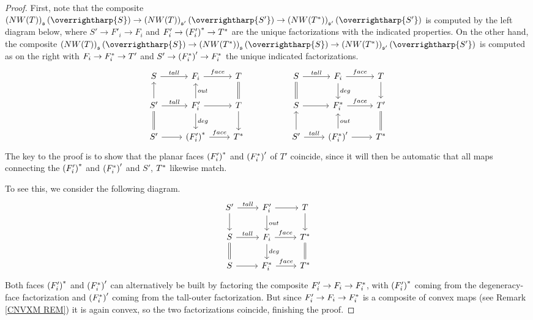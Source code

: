 \documentclass[a4paper,10pt
,draft
]{article}%
\numberwithin{equation}{section}
\numberwithin{figure}{section}
\theoremstyle{definition} %
\newcommand{\vect}[1]{\text{\overrightharp{\ensuremath{#1}}}}
\newcommand{\1}{\ensuremath{\mathbbm 1}}%
\begin{document}
\begin{proof}
First, note that the composite
$\left(NW(T)\right)_{\mathfrak{s}}(\vect{S})
\to 
\left(NW(T)\right)_{\mathfrak{s}'}(\vect{S'})
\to 
\left(NW(T^{\**})\right)_{\mathfrak{s}'}(\vect{S'})$
is computed by the left diagram below,
where
$S' \to F'_i \to F_i$
and 
$F'_i \to \left(F_i'\right)^{\**} \to T^{\**}$
are the unique factorizations with the indicated properties.
On the other hand, the composite
$\left(NW(T)\right)_{\mathfrak{s}}(\vect{S})
\to 
\left(NW(T^{\**})\right)_{\mathfrak{s}}(\vect{S})
\to 
\left(NW(T^{\**})\right)_{\mathfrak{s}'}(\vect{S'})$
is computed as on the right
with 
$F_i \to F^{\**}_i \to T'$ and
$S' \to \left(F_i^{\**}\right)' \to F^{\**}_i$
the unique indicated factorizations.
\begin{equation}
\begin{tikzcd}
	S \ar{r}{tall} 
&
	F_i \ar{r}{face} 
&
	T \ar[equal]{d}
&&%
	S \ar{r}{tall} \ar[equal]{d}
&
	F_i \ar{r}{face} \ar{d}{deg} 
&
	T \ar{d}
\\
	S' \ar{u} \ar{r}{tall} \ar[equal]{d}
&
	F'_i \ar{r} \ar{u}[swap]{out} \ar{d}{deg}
&
	T \ar{d}
&&%
	S \ar{r}
&
	F^{\**}_i \ar{r}{face} 
&
	T' \ar[equal]{d}
\\
	S' \ar{r}
&
	\left(F_i'\right)^{\**} \ar{r}{face}
&
	T^{\**}
&&%
	S' \ar{r}{tall} \ar{u}
&
	\left(F_i^{\**}\right)' \ar{r} \ar{u}[swap]{out}
&
	T^{\**}
\end{tikzcd}
\end{equation}
The key to the proof is to show
that the planar faces 
$\left(F_i'\right)^{\**}$ and
$\left(F_i^{\**}\right)'$
of $T'$
coincide, since it will then be automatic that all maps connecting the
$\left(F_i'\right)^{\**}$ and
$\left(F_i^{\**}\right)'$
and $S'$, $T^{\**}$
likewise match.

To see this, we consider the following diagram.
\begin{equation}
\begin{tikzcd}
	S' \ar{r}{tall} \ar{d}
&
	F'_i \ar{r} \ar{d}{out}
&
	T \ar{d}
\\
	S  \ar{r}{tall} \ar[equal]{d}
&
	F_i \ar{r}{face}  \ar{d}{deg}
&
	T^{\**} \ar[equal]{d}
\\
	S \ar{r}
&
	F_i^{\**} \ar{r}{face}
&
	T^{\**}
\end{tikzcd}
\end{equation}
Both faces  
$\left(F'_i\right)^{\**}$ and 
$\left(F^{\**}_i\right)'
$
can alternatively be built by factoring
the composite 
$F'_i \to F_i \to F_i^{\**}$,
with 
$\left(F'_i\right)^{\**}$ 
coming from the 
degeneracy-face factorization
and 
$\left(F^{\**}_i\right)'
$
coming from the 
tall-outer factorization.
But since 
$F'_i \to F_i \to F_i^{\**}$
is a composite of convex maps 
(see Remark \ref{CNVXM REM})
it is again convex, 
so the two factorizations coincide, 
finishing the proof.
\end{proof}
\end{document}
